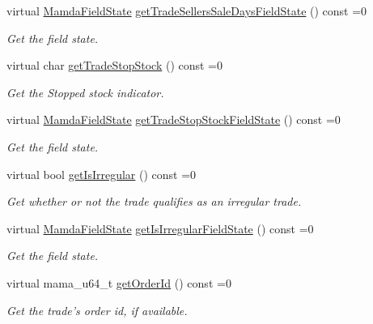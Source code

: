 \begin{CompactItemize}
virtual \hyperlink{namespaceWombat_93aac974f2ab713554fd12a1fa3b7d2a}{Mamda\-Field\-State} \hyperlink{classWombat_1_1MamdaTradeOutOfSequence_1a060e2fe8efbc8fda0994cb8ea3d707}{get\-Trade\-Sellers\-Sale\-Days\-Field\-State} () const =0
\begin{CompactList}\small\item\em Get the field state. \item\end{CompactList}\item 
virtual char \hyperlink{classWombat_1_1MamdaTradeOutOfSequence_648c384ede932f120d0005dd9419fa32}{get\-Trade\-Stop\-Stock} () const =0
\begin{CompactList}\small\item\em Get the Stopped stock indicator. \item\end{CompactList}\item 
virtual \hyperlink{namespaceWombat_93aac974f2ab713554fd12a1fa3b7d2a}{Mamda\-Field\-State} \hyperlink{classWombat_1_1MamdaTradeOutOfSequence_c8c1bfde9213edffe475933823525ec9}{get\-Trade\-Stop\-Stock\-Field\-State} () const =0
\begin{CompactList}\small\item\em Get the field state. \item\end{CompactList}\item 
virtual bool \hyperlink{classWombat_1_1MamdaTradeOutOfSequence_21fdd9b443f09d363fa8d3ad02d8306d}{get\-Is\-Irregular} () const =0
\begin{CompactList}\small\item\em Get whether or not the trade qualifies as an irregular trade. \item\end{CompactList}\item 
virtual \hyperlink{namespaceWombat_93aac974f2ab713554fd12a1fa3b7d2a}{Mamda\-Field\-State} \hyperlink{classWombat_1_1MamdaTradeOutOfSequence_5be439fc6e3ede18f1b9858245e1f82d}{get\-Is\-Irregular\-Field\-State} () const =0
\begin{CompactList}\small\item\em Get the field state. \item\end{CompactList}\item 
virtual mama\_\-u64\_\-t \hyperlink{classWombat_1_1MamdaTradeOutOfSequence_2dd8d7a5f09caeae16110a319d6f255c}{get\-Order\-Id} () const =0
\begin{CompactList}\small\item\em Get the trade's order id, if available. \item\end{CompactList}\item 

\end{CompactItemize}

